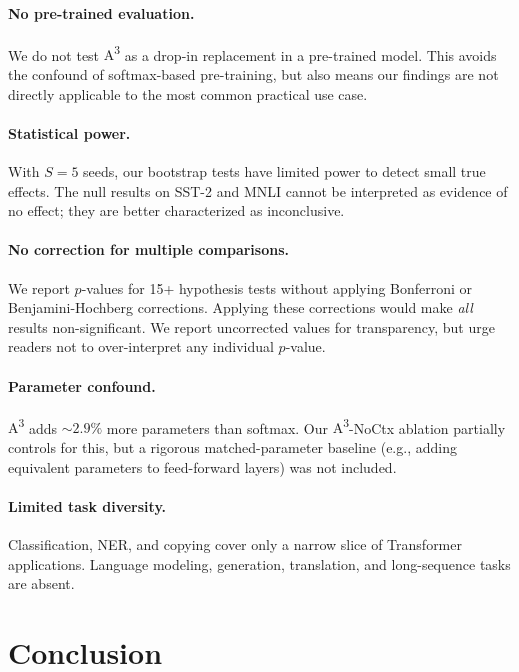 \documentclass[11pt]{article}
\newcommand{\AAA}{\textsc{A\textsuperscript{3}}}
\begin{document}
\paragraph{No pre-trained evaluation.} We do not test \AAA{} as a drop-in replacement in a pre-trained model. This avoids the confound of softmax-based pre-training, but also means our findings are not directly applicable to the most common practical use case.

\paragraph{Statistical power.} With $S=5$ seeds, our bootstrap tests have limited power to detect small true effects. The null results on SST-2 and MNLI cannot be interpreted as evidence of no effect; they are better characterized as inconclusive.

\paragraph{No correction for multiple comparisons.} We report $p$-values for 15+ hypothesis tests without applying Bonferroni or Benjamini-Hochberg corrections. Applying these corrections would make \emph{all} results non-significant. We report uncorrected values for transparency, but urge readers not to over-interpret any individual $p$-value.

\paragraph{Parameter confound.} \AAA{} adds $\sim 2.9\%$ more parameters than softmax. Our \AAA{}-NoCtx ablation partially controls for this, but a rigorous matched-parameter baseline (e.g., adding equivalent parameters to feed-forward layers) was not included.

\paragraph{Limited task diversity.} Classification, NER, and copying cover only a narrow slice of Transformer applications. Language modeling, generation, translation, and long-sequence tasks are absent.

\section{Conclusion}
\label{sec:conclusion}
\end{document}
